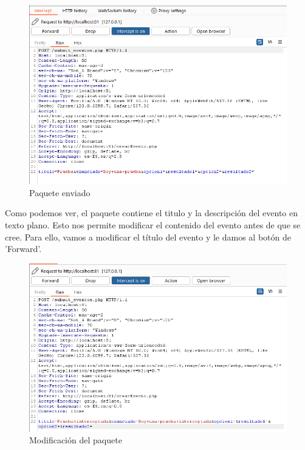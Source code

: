\documentclass{report}
\begin{document}
                \begin{figure}[H]
                    \centering
                    \includegraphics[width=1\textwidth]{./img/vulnerabilidades/2.2/2.3.png}
                    \caption{Paquete enviado}
                \end{figure}
                \clearpage
                Como podemos ver, el paquete contiene el titulo y la descripción del evento en texto plano.
                Esto nos permite modificar el contenido del evento antes de que se cree.
                Para ello, vamos a modificar el título del evento y le damos al botón de 'Forward'.
                \begin{figure}[H]
                    \centering
                    \includegraphics[width=1\textwidth]{./img/vulnerabilidades/2.2/2.4.png}
                    \caption{Modificación del paquete}
                \end{figure}
\end{document}
